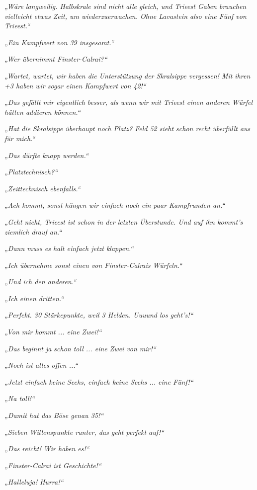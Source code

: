 \textit{„Wäre langweilig. Halbskrale sind nicht alle gleich, und Trieest Gaben brauchen vielleicht etwas Zeit, um wiederzuerwachen. Ohne Lavastein also eine Fünf von Trieest.“}

\textit{„Ein Kampfwert von 39 insgesamt.“}

\textit{„Wer übernimmt Finster-Calrai?“}

\textit{„Wartet, wartet, wir haben die Unterstützung der Skralsippe vergessen! Mit ihren +3 haben wir sogar einen Kampfwert von 42!“}

\textit{„Das gefällt mir eigentlich besser, als wenn wir mit Trieest einen anderen Würfel hätten addieren können.“}

\textit{„Hat die Skralsippe überhaupt noch Platz? Feld 52 sieht schon recht überfüllt aus für mich.“}

\textit{„Das dürfte knapp werden.“}

\textit{„Platztechnisch?“}

\textit{„Zeittechnisch ebenfalls.“}

\textit{„Ach kommt, sonst hängen wir einfach noch ein paar Kampfrunden an.“}

\textit{„Geht nicht, Trieest ist schon in der letzten Überstunde. Und auf ihn kommt’s ziemlich drauf an.“}

\textit{„Dann muss es halt einfach jetzt klappen.“}

\textit{„Ich übernehme sonst einen von Finster-Calrais Würfeln.“}

\textit{„Und ich den anderen.“}

\textit{„Ich einen dritten.“}

\textit{„Perfekt. 30 Stärkepunkte, weil 3 Helden. Uuuund los geht’s!“}

\textit{„Von mir kommt ... eine Zwei!“}

\textit{„Das beginnt ja schon toll ... eine Zwei von mir!“}

\textit{„Noch ist alles offen ...“}

\textit{„Jetzt einfach keine Sechs, einfach keine Sechs ... eine Fünf!“}

\textit{„Na toll!“}

\textit{„Damit hat das Böse genau 35!“}

\textit{„Sieben Willenspunkte runter, das geht perfekt auf!“}

\textit{„Das reicht! Wir haben es!“}

\textit{„Finster-Calrai ist Geschichte!“}

\textit{„Halleluja! Hurra!“}


